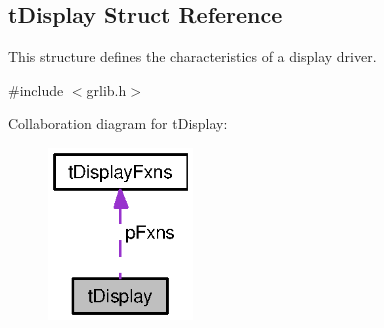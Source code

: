 \subsection{t\+Display Struct Reference}
\label{structt_display}


This structure defines the characteristics of a display driver.  




{\ttfamily \#include $<$grlib.\+h$>$}



Collaboration diagram for t\+Display\+:
\nopagebreak
\begin{figure}[H]
\begin{center}
\leavevmode
\includegraphics[width=109pt]{structt_display__coll__graph}
\end{center}
\end{figure}

